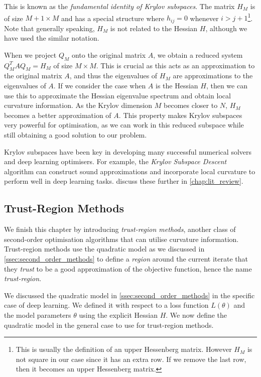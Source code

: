 This is known as the \textit{fundamental identity of Krylov subspaces}. The matrix $H_M$ is of size $M+1 \times M$ and has a special structure where $h_{ij} = 0$ whenever $i > j + 1$\footnote{This is usually the definition of an upper Hessenberg matrix. However $H_M$ is not square in our case since it has an extra row. If we remove the last row, then it becomes an upper Hessenberg matrix.}. Note that generally speaking, $H_M$ is not related to the Hessian $H$, although we have used the similar notation.

When we project $Q_M$ onto the original matrix $A$, we obtain a reduced system $Q_M^T A Q_M = H_M$ of size $M \times M$. This is crucial as this acts as an approximation to the original matrix $A$, and thus the eigenvalues of $H_M$ are approximations to the eigenvalues of $A$. If we consider the case when $A$ is the Hessian $H$, then we can use this to approximate the Hessian eigenvalue spectrum and obtain local curvature information. As the Krylov dimension $M$ becomes closer to $N$, $H_M$ becomes a better approximation of $A$. This property makes Krylov subspaces very powerful for optimisation, as we can work in this reduced subspace while still obtaining a good solution to our problem.

Krylov subspaces have been key in developing many successful numerical solvers and deep learning optimisers. For example, the \textit{Krylov Subspace Descent} algorithm can construct sound approximations and incorporate local curvature to perform well in deep learning tasks.  discuss these further in \cref{chap:lit_review}.

\subsection{Trust-Region Methods}
\label{ssec:trust_region_methods}

We finish this chapter by introducing \textit{trust-region methods}, another class of second-order optimisation algorithms that can utilise curvature information. Trust-region methods use the quadratic model as we discussed in \cref{ssec:second_order_methods} to define a \textit{region} around the current iterate that they \textit{trust} to be a good approximation of the objective function, hence the name \textit{trust-region}. 

We discussed the quadratic model in \cref{ssec:second_order_methods} in the specific case of deep learning. We defined it with respect to a loss function $L(\theta)$ and the model parameters $\theta$ using the explicit Hessian $H$. We now define the quadratic model in the general case to use for trust-region methods.

